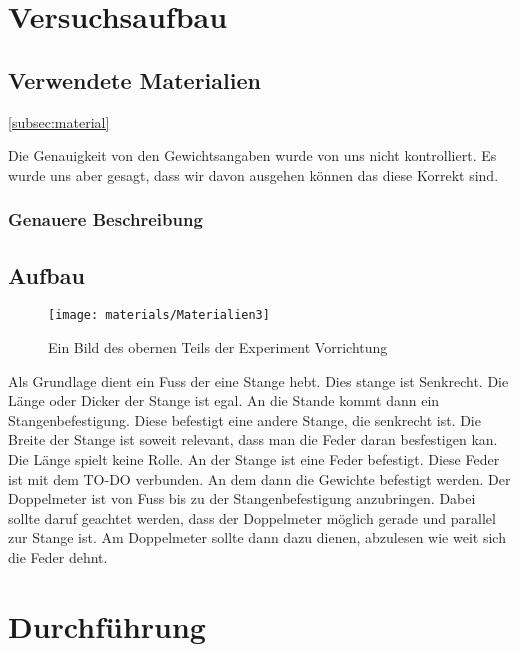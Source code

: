 \documentclass[../main.tex]{subfiles} %
\begin{document}
\section{Versuchsaufbau}\label{sec:versuchsaufbau}
    \subsection{Verwendete Materialien}\label{subsec:versuchsaufbau}\ref{subsec:material}\label{zu der Materialliste}
    \begin{tcolorbox}[title=Hinweis zu den Gewichtsangeben]
        Die Genauigkeit von den Gewichtsangaben wurde von uns nicht kontrolliert.
        Es wurde uns aber gesagt, dass wir davon ausgehen können das diese Korrekt sind.
    \end{tcolorbox}
    \subsubsection{Genauere Beschreibung}\label{subsubsec:materialien}

    \subsection{Aufbau}\label{subsec:aufbau}

    \begin{figure}[H]
        \centering
        \texttt{[image: materials/Materialien3]}
        \caption{Ein Bild des obernen Teils der Experiment Vorrichtung  \textcolor{blue}{\underline{}}}
        \label{fig:material3}
    \end{figure}

    Als Grundlage dient ein Fuss der eine Stange hebt. Dies stange ist Senkrecht. 
    Die Länge oder Dicker der Stange ist egal. An die Stande kommt dann ein Stangenbefestigung. 
    Diese befestigt eine andere Stange, die senkrecht ist. 
    Die Breite der Stange ist soweit relevant, dass man die Feder daran besfestigen kan. Die Länge spielt keine Rolle.
    An der Stange ist eine Feder befestigt. Diese Feder ist mit dem TO-DO verbunden.
    An dem dann die Gewichte befestigt werden.
    Der Doppelmeter ist von Fuss bis zu der Stangenbefestigung anzubringen. Dabei sollte daruf geachtet werden, dass der Doppelmeter möglich gerade und parallel zur Stange ist.
    Am Doppelmeter sollte dann dazu dienen, abzulesen wie weit sich die Feder dehnt.

    \section{Durchführung}\label{sec:durchführung}
    
\end{document}
